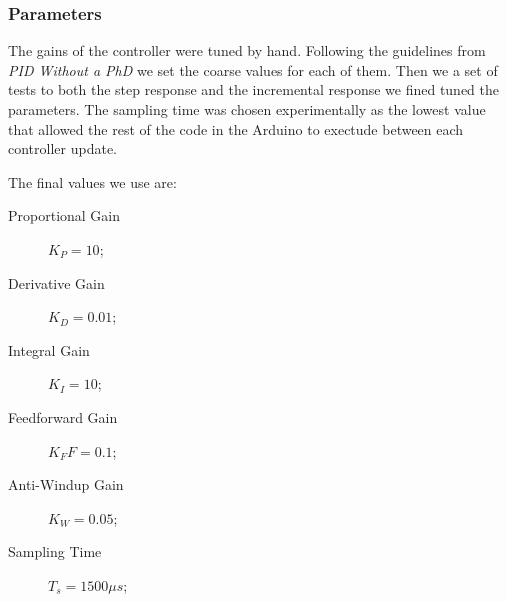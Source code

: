 \subsubsection{Parameters}
\label{sub:Parameters}

The gains of the controller were tuned by hand.
Following the guidelines from \emph{PID Without a PhD} \cite{PIDWhitoutPhD} we set the coarse values for each of them.
Then we a set of tests to both the step response and the incremental response we fined tuned the parameters.
The sampling time was chosen experimentally as the lowest value that allowed the rest of the code in the Arduino to exectude between each controller update.

The final values we use are:
\begin{description}
    \item[Proportional Gain] $K_P = 10$;
    \item[Derivative Gain] $K_D = 0.01$;
    \item[Integral Gain] $K_I = 10$;
    \item[Feedforward Gain] $K_FF = 0.1$;
    \item[Anti-Windup Gain] $K_W = 0.05$;
    \item[Sampling Time] $T_s = 1500 \mu s$;
\end{description}
